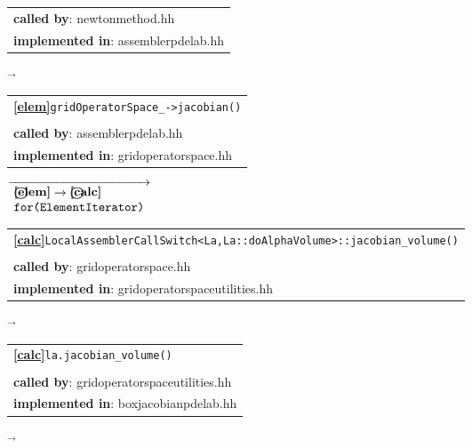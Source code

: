 \begin{landscape}
{\begin{tabular}{|l|}
      \textbf{called by}: newtonmethod.hh\\
      \textbf{implemented in}: assemblerpdelab.hh\\  
	\hline
  \end{tabular}
    $\overrightarrow{
    }$
       \begin{tabular}{|l|}
      \hline
    	\textbf{\textcircled{\ref{elem}}}\verb+gridOperatorSpace_->jacobian()+ \\
    	\begin{scriptsize}\end{scriptsize}\\
      	\textbf{called by}: assemblerpdelab.hh\\
      	\textbf{implemented in}: gridoperatorspace.hh\\  
	\hline
  \end{tabular}
    \nextline
    {\scriptsize$\overrightarrow{\begin{array}{l}
				  \textbf{\textcircled{\ref{elem}}}\rightarrow\textbf{\textcircled{\ref{calc}}}\\
				  \texttt{for(ElementIterator)}
                                \end{array}
    }$}
     \begin{tabular}{|l|}
      \hline
      \textbf{\textcircled{\ref{calc}}}\verb+LocalAssemblerCallSwitch<La,La::doAlphaVolume>::jacobian_volume()+ \\
      \begin{scriptsize}\end{scriptsize}\\
      \textbf{called by}: gridoperatorspace.hh\\
      \textbf{implemented in}: gridoperatorspaceutilities.hh\\  
      \hline
     \end{tabular}
\nextline
    $\overrightarrow{
    }$
     \begin{tabular}{|l|}
      \hline
     \textbf{\textcircled{\ref{calc}}}\verb+la.jacobian_volume()+ \\
     \begin{scriptsize}\end{scriptsize}\\
      \textbf{called by}: gridoperatorspaceutilities.hh\\
      \textbf{implemented in}:  boxjacobianpdelab.hh\\  
	\hline
  \end{tabular}
    $\overrightarrow{
    }$
    \begin{tabular}{|l|}

\end{tabular}}
\end{landscape}
